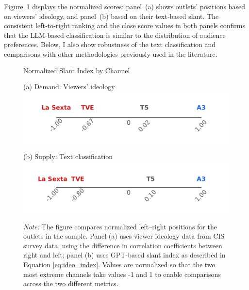 \documentclass[12pt]{article}
\begin{document}
 
 Figure~\ref{fig:channel_ideology_lines} displays the normalized scores: panel~(a) shows outlets' positions based on viewers’ ideology, and panel~(b) based on their text‐based slant. The consistent left‐to‐right ranking and the close score values in both panels confirms that the LLM‐based classification is similar to  the distribution of audience preferences. Below, I also show robustness of the text classification and comparisons with other methodologies previously used in the literature.
		
	
	
		\begin{figure}[!htbp]
		\centering
		\caption{Normalized Slant Index by Channel}

		\begin{minipage}[t]{0.49\textwidth}
			\centering
					(a) Demand: Viewers' ideology
		\includegraphics[width=\linewidth]{figures/congress_line_cis}
		\end{minipage}
		\hfill
		\begin{minipage}[t]{0.49\textwidth}
			\centering

			
				(b) Supply: Text classification
			\includegraphics[width=\linewidth]{figures/congress_line_chatgpt}
			
			
		\end{minipage}
		
		
		\caption*{\small \textit{Note:} The figure compares normalized left–right positions for the outlets in the sample. Panel (a) uses viewer ideology data from CIS survey data, using the difference in correlation coefficients between right and left; panel (b) uses GPT-based slant index as described in Equation \eqref{eq:ideo_index}. Values are normalized so that the two most extreme channels take values -1 and 1 to enable comparisons across the two different metrics. }
		\label{fig:channel_ideology_lines}
	\end{figure}
	
\end{document}
